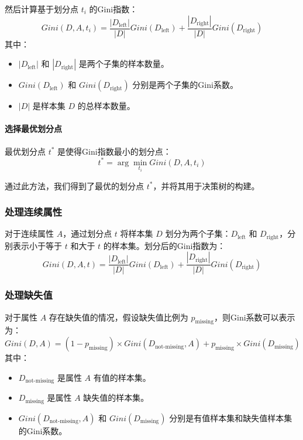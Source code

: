 然后计算基于划分点 \(t_i\) 的Gini指数：
\begin{equation}
	Gini(D, A, t_i) = \frac{|D_{\text{left}}|}{|D|} Gini(D_{\text{left}}) + \frac{|D_{\text{right}}|}{|D|} Gini(D_{\text{right}})
\end{equation}
其中：
\begin{itemize}
	\item \(|D_{\text{left}}|\) 和 \(|D_{\text{right}}|\) 是两个子集的样本数量。
	\item \(Gini(D_{\text{left}})\) 和 \(Gini(D_{\text{right}})\) 分别是两个子集的Gini系数。
	\item \(|D|\) 是样本集 \(D\) 的总样本数量。
\end{itemize}
\paragraph{选择最优划分点}
最优划分点 \(t^*\) 是使得Gini指数最小的划分点：
\begin{equation}
	t^* = \arg\min_{t_i} Gini(D, A, t_i)
\end{equation}

通过此方法，我们得到了最优的划分点 \(t^*\)，并将其用于决策树的构建。






\subsubsection{处理连续属性}
对于连续属性 \(A\)，通过划分点 \(t\) 将样本集 \(D\) 划分为两个子集：\(D_{\text{left}}\) 和 \(D_{\text{right}}\)，分别表示小于等于 \(t\) 和大于 \(t\) 的样本集。划分后的Gini指数为：
\begin{equation}
	Gini(D, A, t) = \frac{|D_{\text{left}}|}{|D|} Gini(D_{\text{left}}) + \frac{|D_{\text{right}}|}{|D|} Gini(D_{\text{right}})
\end{equation}


\subsubsection{处理缺失值}
对于属性 \(A\) 存在缺失值的情况，假设缺失值比例为 \(p_{\text{missing}}\)，则Gini系数可以表示为：
\begin{equation}
	Gini(D, A) = (1 - p_{\text{missing}}) \times Gini(D_{\text{not-missing}}, A) + p_{\text{missing}} \times Gini(D_{\text{missing}})
\end{equation}
其中：
\begin{itemize}
	\item \(D_{\text{not-missing}}\) 是属性 \(A\) 有值的样本集。
	\item \(D_{\text{missing}}\) 是属性 \(A\) 缺失值的样本集。
	\item \(Gini(D_{\text{not-missing}}, A)\) 和 \(Gini(D_{\text{missing}})\) 分别是有值样本集和缺失值样本集的Gini系数。
\end{itemize}
\vspace*{1cm}


